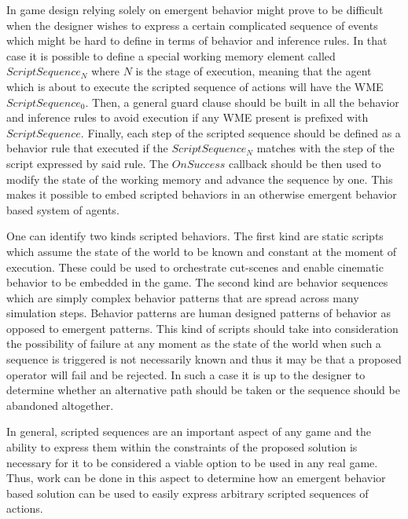 In game design relying solely on emergent behavior might prove to be difficult when the designer wishes to express a certain complicated sequence of events which might be hard to define in terms of behavior and inference rules.
In that case it is possible to define a special working memory element called $ScriptSequence_N$ where $N$ is the stage of execution, meaning that the agent which is about to execute the scripted sequence of actions will have the WME $ScriptSequence_0$.
Then, a general guard clause should be built in all the behavior and inference rules to avoid execution if any WME present is prefixed with $ScriptSequence$.
Finally, each step of the scripted sequence should be defined as a behavior rule that executed if the $ScriptSequence_N$ matches with the step of the script expressed by said rule.
The $OnSuccess$ callback should be then used to modify the state of the working memory and advance the sequence by one.
This makes it possible to embed scripted behaviors in an otherwise emergent behavior based system of agents.

One can identify two kinds scripted behaviors.
The first kind are static scripts which assume the state of the world to be known and constant at the moment of execution.
These could be used to orchestrate cut-scenes and enable cinematic behavior to be embedded in the game.
The second kind are behavior sequences which are simply complex behavior patterns that are spread across many simulation steps.
Behavior patterns are human designed patterns of behavior as opposed to emergent patterns.
This kind of scripts should take into consideration the possibility of failure at any moment as the state of the world when such a sequence is triggered is not necessarily known and thus it may be that a proposed operator will fail and be rejected.
In such a case it is up to the designer to determine whether an alternative path should be taken or the sequence should be abandoned altogether.

In general, scripted sequences are an important aspect of any game and the ability to express them within the constraints of the proposed solution is necessary for it to be considered a viable option to be used in any real game.
Thus, work can be done in this aspect to determine how an emergent behavior based solution can be used to easily express arbitrary scripted sequences of actions.